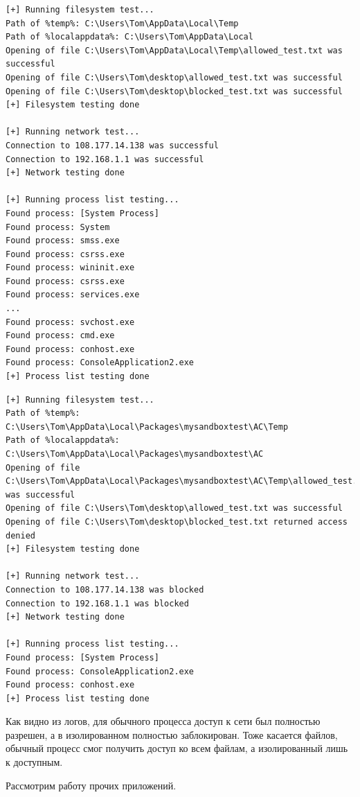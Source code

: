 \begin{lstlisting}[language={}, caption={Лог обычного процесса}]
[+] Running filesystem test...
Path of %temp%: C:\Users\Tom\AppData\Local\Temp
Path of %localappdata%: C:\Users\Tom\AppData\Local
Opening of file C:\Users\Tom\AppData\Local\Temp\allowed_test.txt was successful
Opening of file C:\Users\Tom\desktop\allowed_test.txt was successful
Opening of file C:\Users\Tom\desktop\blocked_test.txt was successful
[+] Filesystem testing done

[+] Running network test...
Connection to 108.177.14.138 was successful
Connection to 192.168.1.1 was successful
[+] Network testing done

[+] Running process list testing...
Found process: [System Process]
Found process: System
Found process: smss.exe
Found process: csrss.exe
Found process: wininit.exe
Found process: csrss.exe
Found process: services.exe
...
Found process: svchost.exe
Found process: cmd.exe
Found process: conhost.exe
Found process: ConsoleApplication2.exe
[+] Process list testing done
\end{lstlisting}
\begin{lstlisting}[language={}, caption={Лог изолированного процесса}]
[+] Running filesystem test...
Path of %temp%: C:\Users\Tom\AppData\Local\Packages\mysandboxtest\AC\Temp
Path of %localappdata%: C:\Users\Tom\AppData\Local\Packages\mysandboxtest\AC
Opening of file C:\Users\Tom\AppData\Local\Packages\mysandboxtest\AC\Temp\allowed_test.txt was successful
Opening of file C:\Users\Tom\desktop\allowed_test.txt was successful
Opening of file C:\Users\Tom\desktop\blocked_test.txt returned access denied
[+] Filesystem testing done

[+] Running network test...
Connection to 108.177.14.138 was blocked
Connection to 192.168.1.1 was blocked
[+] Network testing done

[+] Running process list testing...
Found process: [System Process]
Found process: ConsoleApplication2.exe
Found process: conhost.exe
[+] Process list testing done
\end{lstlisting}
Как видно из логов, для обычного процесса доступ к сети был полностью разрешен, а в изолированном полностью заблокирован. Тоже касается файлов, обычный процесс смог получить доступ ко всем файлам, а изолированный лишь к доступным.

Рассмотрим работу прочих приложений.

